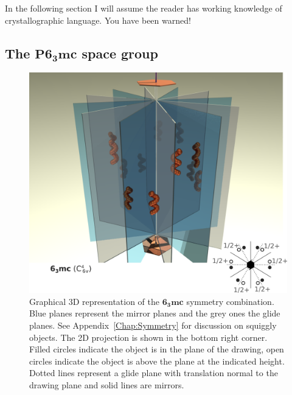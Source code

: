 In the following section I will assume the reader has working knowledge of crystallographic language. You have been warned!


\subsection{The \texorpdfstring{$\mathbf{P6_3mc}$}{P63mc} space group }

\begin{figure}
    \centering
\includegraphics[width=1.\linewidth]{Figures/6_3mc.png}
\caption[Graphical 3D representation of the $\mathbf{6_3mc}$ symmetry.]{Graphical 3D representation of the $\mathbf{6_3mc}$ symmetry combination. Blue planes represent the mirror planes and the grey ones the glide planes. See Appendix~\ref{Chap:Symmetry} for discussion on squiggly objects. The 2D projection is shown in the bottom right corner. Filled circles indicate the object is in the plane of the drawing, open circles indicate the object is above the plane at the indicated height. Dotted lines represent a glide plane with translation normal to the drawing plane and solid lines are mirrors. }
\label{Fig:6_3mc}
\end{figure}


